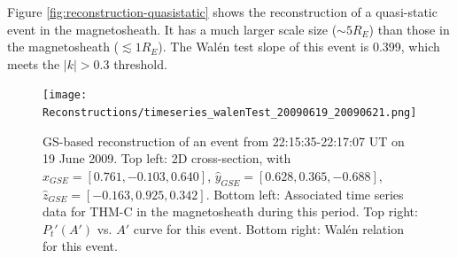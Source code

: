 Figure \ref{fig:reconstruction-quasistatic} shows the reconstruction of a quasi-static event in the magnetosheath. It has a much larger scale size ($\sim 5 R_E$) than those in the magnetosheath ($\lesssim 1 R_E$). The Wal\'en test slope of this event is 0.399, which meets the $|k| > 0.3$ threshold.


\begin{figure}
    \centering
    \texttt{[image: Reconstructions/timeseries\_walenTest\_20090619\_20090621.png]} %
    \caption[GS event reconstructions]{GS-based reconstruction of an event from 22:15:35-22:17:07 UT on 19 June 2009. Top left: 2D cross-section, with $\hat{x}_{GSE}=[0.761, -0.103, 0.640]$, $\hat{y}_{GSE}=[0.628, 0.365, -0.688]$, $\hat{z}_{GSE}=[-0.163,0.925,0.342]$. Bottom left: Associated time series data for THM-C in the magnetosheath during this period. Top right: $P_t'(A')$ vs. $A'$ curve for this event. Bottom right: Wal\'en relation for this event.}
    \label{fig:reconstruction-June2009}
\end{figure}


